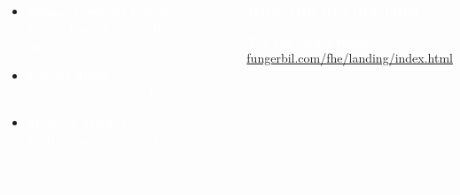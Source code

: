 \documentclass[aspectratio=169,10pt]{beamer}
\begin{document}
\begin{frame}[plain]
\begin{columns}[T,onlytextwidth]
\begin{tcolorbox}[colback=darkblue!80, colframe=solanagreen, width=\textwidth, arc=3mm, title=\textcolor{white}{\textbf{WHY SHADOWBOOK WINS}}]
\begin{itemize}
            \item \textcolor{solanagreen}{\faBolt} \textcolor{white}{\textbf{Solana-Powered Speed}}\\[-0.2cm]
            \textcolor{white}{\small Fastest blockchain + FHE innovation}
            
            \item \textcolor{solanagreen}{\faUsers} \textcolor{white}{\textbf{Expert Team}}\\[-0.2cm]
            \textcolor{white}{\small Deep cryptography \& DeFi expertise}
            
            \item \textcolor{solanagreen}{\faChartLine} \textcolor{white}{\textbf{Massive Market}}\\[-0.2cm]
            \textcolor{white}{\small \$50B+ opportunity and growing}
        \end{itemize}
    \end{tcolorbox}
    
    \begin{center}
        \begin{tcolorbox}[colback=solanagreen!60, colframe=solanagreen, width=\textwidth, arc=5mm, boxrule=1pt, boxsep=0.05cm]
            {\fontsize{16}{18}\selectfont\textcolor{white}{\textbf{JOIN THE REVOLUTION}}}
            
            \vspace{0.05cm}
            \begin{center}
            \end{center}
            
            \vspace{0.05cm}
            {\normalsize\textcolor{white}{\textbf{Try the demo today!}}}\\
            {\small\textcolor{white}{\url{fungerbil.com/fhe/landing/index.html}}}
        \end{tcolorbox}
    \end{center}
\end{columns}

\vspace{0.3cm}
\begin{center}
    \begin{tcolorbox}[colback=darkblue!80, colframe=solanagreen, width=0.8\textwidth, arc=3mm]
        \begin{center}
            \textcolor{solanagreen}{\large\faEnvelope} \qquad \textcolor{white}{\large info@shadowbook.xyz} \qquad \textcolor{solanagreen}{\large\faTwitter}
        \end{center}
    \end{tcolorbox}
    

\end{center}
\end{frame}
\end{document}
